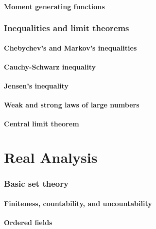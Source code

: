 \documentclass[11pt]{article}
\theoremstyle{definition}
\theoremstyle{plain}
\theoremstyle{remark}
\begin{document}
\subsection{Moment generating functions}

\section{Inequalities and limit theorems}

\subsection{Chebychev’s and Markov’s inequalities}

\subsection{Cauchy-Schwarz inequality}

\subsection{Jensen’s inequality}

\subsection{Weak and strong laws of large numbers}

\subsection{Central limit theorem}

\part{Real Analysis}

\section{Basic set theory}

\subsection{Finiteness, countability, and uncountability}

\subsection{Ordered fields}
\end{document}
